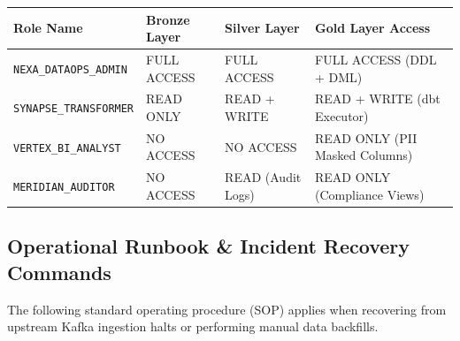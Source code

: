 \documentclass[10pt, a4paper]{article}
\begin{document}
\scriptsize
\begin{tabularx}{\textwidth}{@{}l L L L@{}}
\toprule
{}
\textbf{Role Name} & \textbf{Bronze Layer} & \textbf{Silver Layer} & \textbf{Gold Layer Access} \\
\midrule
\texttt{NEXA\_DATAOPS\_ADMIN} & FULL ACCESS & FULL ACCESS & FULL ACCESS (DDL + DML) \\
\texttt{SYNAPSE\_TRANSFORMER} & READ ONLY & READ + WRITE & READ + WRITE (dbt Executor) \\
\texttt{VERTEX\_BI\_ANALYST} & NO ACCESS & NO ACCESS & READ ONLY (PII Masked Columns) \\
\texttt{MERIDIAN\_AUDITOR} & NO ACCESS & READ (Audit Logs) & READ ONLY (Compliance Views) \\
\bottomrule
\end{tabularx}

\vspace{4pt}

\subsection{Operational Runbook \& Incident Recovery Commands}
The following standard operating procedure (SOP) applies when recovering from upstream Kafka ingestion halts or performing manual data backfills.

\vspace{2pt}
\end{document}
